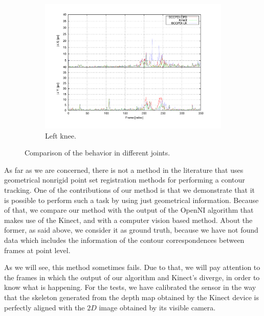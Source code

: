 \begin{figure}[t]
        \begin{subfigure}[b]{0.5\columnwidth}
                \centering
                \includegraphics[width=\textwidth, trim=50 40 80 40,clip]{fig29.pdf}
                \caption{Left knee.}
                \label{fig:cp02_comparison_left_knee}
        \end{subfigure}%

        \caption{Comparison of the behavior in different joints.}\label{fig:cp02_comparison}
\end{figure}

As far as we are concerned, there is not a method in the literature that uses geometrical nonrigid point set 
registration methods for performing a contour tracking. One of the contributions of our method is that we demonstrate 
that it is possible to perform such a task by using just geometrical information. Because of that, we compare our method 
with the output of the OpenNI algorithm that makes use of the Kinect, and with a computer vision based method. About the 
former, as said above, we consider it as ground truth, because we have not found data which includes the information of 
the contour correspondences between frames at point level. 

As we will see, this method sometimes fails. Due to that, we will pay attention to the frames in which the output of 
our algorithm and Kinect's diverge, in order to know what is happening. For the tests, we have calibrated the sensor in 
the way that the skeleton generated from the depth map obtained by the Kinect device is perfectly aligned with the $2D$ 
image obtained by its visible camera.

